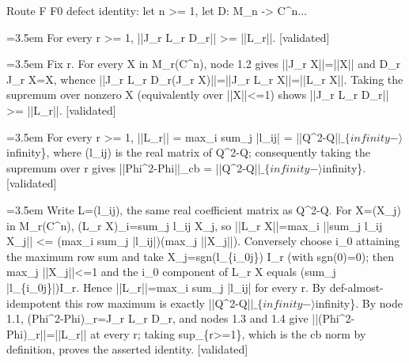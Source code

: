 \documentclass{article}
\newcommand{\step}[1]{\par\noindent\hangindent=3.5em\hangafter=1%
  \makebox[3.5em][l]{\textbf{#1.}}}
\newcommand{\steptag}[1]{\hfill{\small\textsf{[#1]}}}
\begin{document}
\begin{proofbox}{Route F F0 defect identity: let n >= 1, let D: M\_n -> C\textasciicircum{}n...}
\step{1.4} For every r >= 1, ||J\_r L\_r D\_r|| >= ||L\_r||. \steptag{validated} \\[6pt]
\step{1.4.1} Fix r. For every X in M\_r(C\textasciicircum{}n), node 1.2 gives ||J\_r X||=||X|| and D\_r J\_r X=X, whence ||J\_r L\_r D\_r(J\_r X)||=||J\_r L\_r X||=||L\_r X||. Taking the supremum over nonzero X (equivalently over ||X||<=1) shows ||J\_r L\_r D\_r|| >= ||L\_r||. \steptag{validated} \\[4pt]
\step{1.5} For every r >= 1, ||L\_r|| = max\_i sum\_j |l\_ij| = ||Q\textasciicircum{}2-Q|$|\_\{infinity-\rangle$infinity\}, where (l\_ij) is the real matrix of Q\textasciicircum{}2-Q; consequently taking the supremum over r gives ||Phi\textasciicircum{}2-Phi||\_cb = ||Q\textasciicircum{}2-Q|$|\_\{infinity-\rangle$infinity\}. \steptag{validated} \\[6pt]
\step{1.5.1} Write L=(l\_ij), the same real coefficient matrix as Q\textasciicircum{}2-Q. For X=(X\_j) in M\_r(C\textasciicircum{}n), (L\_r X)\_i=sum\_j l\_ij X\_j, so ||L\_r X||=max\_i ||sum\_j l\_ij X\_j|| <= (max\_i sum\_j |l\_ij|)(max\_j ||X\_j||). Conversely choose i\_0 attaining the maximum row sum and take X\_j=sgn(l\_\{i\_0j\}) I\_r (with sgn(0)=0); then max\_j ||X\_j||<=1 and the i\_0 component of L\_r X equals (sum\_j |l\_\{i\_0j\}|)I\_r. Hence ||L\_r||=max\_i sum\_j |l\_ij| for every r. By def-almost-idempotent this row maximum is exactly ||Q\textasciicircum{}2-Q|$|\_\{infinity-\rangle$infinity\}. By node 1.1, (Phi\textasciicircum{}2-Phi)\_r=J\_r L\_r D\_r, and nodes 1.3 and 1.4 give ||(Phi\textasciicircum{}2-Phi)\_r||=||L\_r|| at every r; taking sup\_\{r>=1\}, which is the cb norm by definition, proves the asserted identity. \steptag{validated} \\[4pt]
\end{proofbox}
\end{document}
